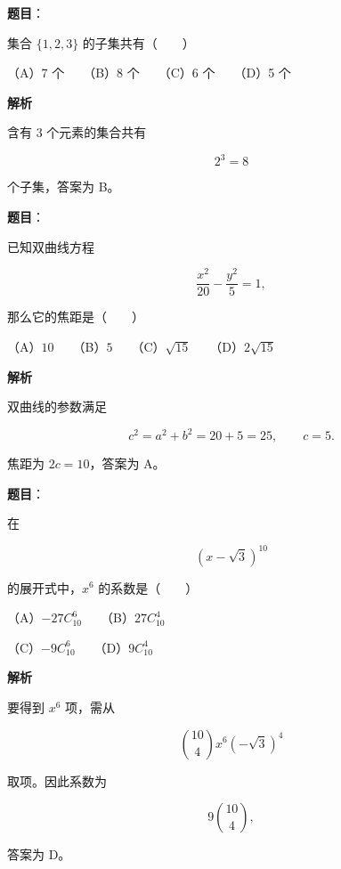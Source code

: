 \begin{answer}

\textbf{题目}：

集合 $\{1,2,3\}$ 的子集共有\mbox{（　　）}

（A）7 个　　（B）8 个　　（C）6 个　　（D）5 个

\textbf{解析}

含有 $3$ 个元素的集合共有

\nopagebreak[4]
\[
2^3=8
\]

个子集，答案为 B。


\end{answer}
\begin{answer}

\textbf{题目}：

已知双曲线方程

\nopagebreak[4]
\[
\frac{x^2}{20}-\frac{y^2}{5}=1,
\]

那么它的焦距是\mbox{（　　）}

（A）$10$　　（B）$5$　　（C）$\sqrt{15}$　　（D）$2\sqrt{15}$

\textbf{解析}

双曲线的参数满足

\nopagebreak[4]
\[
c^2=a^2+b^2=20+5=25,
\qquad c=5.
\]

焦距为 $2c=10$，答案为 A。


\end{answer}
\begin{answer}

\textbf{题目}：

在

\nopagebreak[4]
\[
(x-\sqrt3)^{10}
\]

的展开式中，$x^6$ 的系数是\mbox{（　　）}

（A）$-27C_{10}^{6}$　　（B）$27C_{10}^{4}$

（C）$-9C_{10}^{6}$　　（D）$9C_{10}^{4}$

\textbf{解析}

要得到 $x^6$ 项，需从

\nopagebreak[4]
\[
\binom{10}{4}x^6(-\sqrt3)^4
\]

取项。因此系数为

\nopagebreak[4]
\[
9\binom{10}{4},
\]

答案为 D。


\end{answer}

